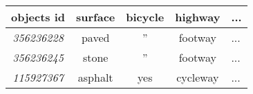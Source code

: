 \documentclass[border={15pt 1pt 5pt 1pt}, varwidth=38em]{standalone}
\begin{document}
\newcommand{\rpm}{\sbox0{$1$}\sbox2{$\scriptstyle\pm$}
  \raise\dimexpr(\ht0-\ht2)/2\relax\box2 }

\begin{table}[]
\centering
\begin{tabular}{c|c|c|c|l}
objects id & surface & bicycle & highway & ... \\ \hline
\textit{356236228} & paved & '' & footway & ... \\
\textit{356236245} & stone & '' & footway & ... \\
\textit{115927367} & asphalt & yes & cycleway & ... \\
\end{tabular}
\end{table}
\end{document}
